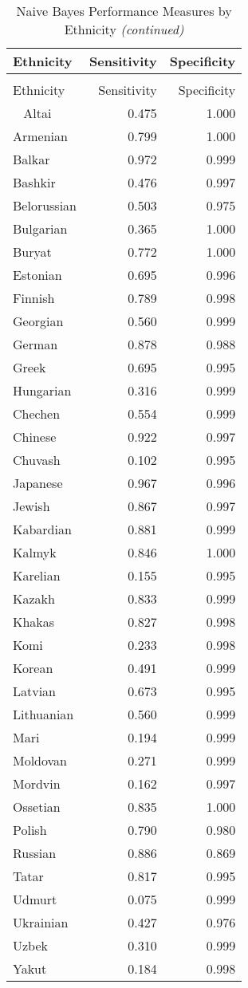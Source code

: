 \begingroup\fontsize{8}{10}\selectfont

\begin{longtable}{lrr}
\caption{\label{tab:sens_spec}Naive Bayes Performance Measures by Ethnicity}\\
\toprule
Ethnicity & Sensitivity & Specificity\\
\midrule
\endfirsthead
\caption[]{Naive Bayes Performance Measures by Ethnicity \textit{(continued)}}\\
\toprule
Ethnicity & Sensitivity & Specificity\\
\midrule
\endhead
\
\endfoot
\bottomrule
\endlastfoot
Altai & 0.475 & 1.000\\
Armenian & 0.799 & 1.000\\
Balkar & 0.972 & 0.999\\
Bashkir & 0.476 & 0.997\\
Belorussian & 0.503 & 0.975\\
Bulgarian & 0.365 & 1.000\\
Buryat & 0.772 & 1.000\\
Estonian & 0.695 & 0.996\\
Finnish & 0.789 & 0.998\\
Georgian & 0.560 & 0.999\\
German & 0.878 & 0.988\\
Greek & 0.695 & 0.995\\
Hungarian & 0.316 & 0.999\\
Chechen & 0.554 & 0.999\\
Chinese & 0.922 & 0.997\\
Chuvash & 0.102 & 0.995\\
Japanese & 0.967 & 0.996\\
Jewish & 0.867 & 0.997\\
Kabardian & 0.881 & 0.999\\
Kalmyk & 0.846 & 1.000\\
Karelian & 0.155 & 0.995\\
Kazakh & 0.833 & 0.999\\
Khakas & 0.827 & 0.998\\
Komi & 0.233 & 0.998\\
Korean & 0.491 & 0.999\\
Latvian & 0.673 & 0.995\\
Lithuanian & 0.560 & 0.999\\
Mari & 0.194 & 0.999\\
Moldovan & 0.271 & 0.999\\
Mordvin & 0.162 & 0.997\\
Ossetian & 0.835 & 1.000\\
Polish & 0.790 & 0.980\\
Russian & 0.886 & 0.869\\
Tatar & 0.817 & 0.995\\
Udmurt & 0.075 & 0.999\\
Ukrainian & 0.427 & 0.976\\
Uzbek & 0.310 & 0.999\\
Yakut & 0.184 & 0.998\\*
\end{longtable}\endgroup{}